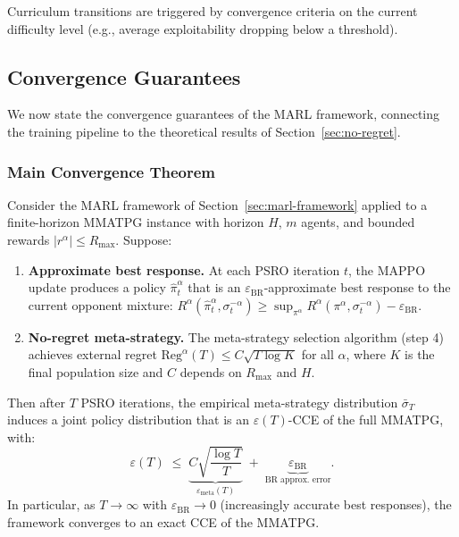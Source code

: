 Curriculum transitions are triggered by convergence criteria on the current difficulty level (e.g., average exploitability dropping below a threshold).


\subsection{Convergence Guarantees}\label{sec:convergence}

We now state the convergence guarantees of the MARL framework, connecting the training pipeline to the theoretical results of Section~\ref{sec:no-regret}.


\subsubsection{Main Convergence Theorem}

\begin{theorem}\label{thm:marl-convergence}
Consider the MARL framework of Section~\ref{sec:marl-framework} applied to a finite-horizon MMATPG instance with horizon $H$, $m$ agents, and bounded rewards $|r^\alpha| \le R_{\max}$. Suppose:
\begin{enumerate}
    \item[(A1)] \textbf{Approximate best response.} At each PSRO iteration $t$, the MAPPO update produces a policy $\hat\pi^\alpha_t$ that is an $\varepsilon_{\mathrm{BR}}$-approximate best response to the current opponent mixture: $R^\alpha(\hat\pi^\alpha_t, \sigma^{-\alpha}_t) \ge \sup_{\pi^\alpha} R^\alpha(\pi^\alpha, \sigma^{-\alpha}_t) - \varepsilon_{\mathrm{BR}}$.
    
    \item[(A2)] \textbf{No-regret meta-strategy.} The meta-strategy selection algorithm (step 4) achieves external regret $\mathrm{Reg}^\alpha(T) \le C\sqrt{T\log K}$ for all $\alpha$, where $K$ is the final population size and $C$ depends on $R_{\max}$ and $H$.
\end{enumerate}
Then after $T$ PSRO iterations, the empirical meta-strategy distribution $\bar\sigma_T$ induces a joint policy distribution that is an $\varepsilon(T)$-CCE of the full MMATPG, with:
\[
\varepsilon(T) \;\le\; \underbrace{C\sqrt{\frac{\log T}{T}}}_{\varepsilon_{\mathrm{meta}}(T)} \;+\; \underbrace{\varepsilon_{\mathrm{BR}}}_{\text{BR approx.\ error}}.
\]
In particular, as $T\to\infty$ with $\varepsilon_{\mathrm{BR}}\to 0$ (increasingly accurate best responses), the framework converges to an exact CCE of the MMATPG.
\end{theorem}

